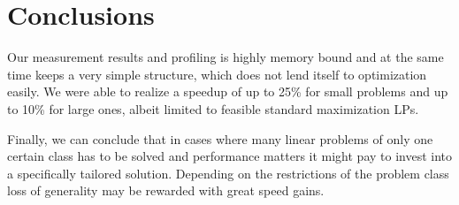\documentclass[letterpaper]{article}
\begin{document}

\section{Conclusions}

Our measurement results and profiling is highly memory bound and at the same time keeps
a very simple structure, which does not lend itself to optimization easily.
We were able to realize a speedup of up to 25\% for small problems and up to 10\% for large ones,
albeit limited to feasible standard maximization LPs.

Finally, we can conclude that in cases where many linear problems of only one certain 
class has to be solved and performance matters it might pay to invest into a specifically
tailored solution. Depending on the restrictions of the problem class loss of generality
may be rewarded with great speed gains.






\end{document}
